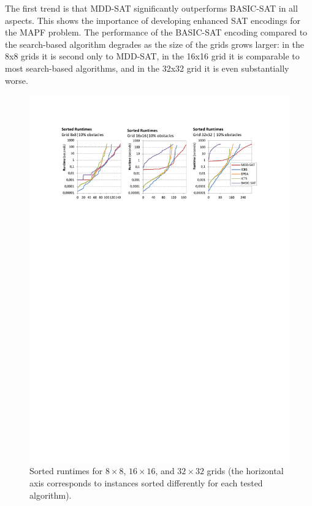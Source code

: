 \documentclass[jair,oneside,11pt]{article}
\begin{document}
The first trend is that MDD-SAT significantly outperforms BASIC-SAT in all aspects. This shows the importance of developing enhanced SAT encodings for the MAPF problem. The performance of the BASIC-SAT encoding compared to the search-based algorithm degrades as the size of the grids grows larger: in the 8x8 grids it is second only to MDD-SAT, in the 16x16 grid it is comparable to most search-based algorithms, and in the 32x32 grid it is even substantially worse.

\begin{figure}[h]
\centering
\includegraphics[trim={2.5cm 21.0cm 2.5cm 2.5cm},clip,width=\textwidth]{expr_grids-sorted.pdf}
\vspace{-0.4cm}
\caption{Sorted runtimes for $8{}\times{}8$, $16{}\times{}16$, and $32{}\times{}32$ grids (the horizontal axis corresponds to instances sorted differently for each tested algorithm).}
\label{expr_grids-sorted}
\end{figure}
\end{document}
